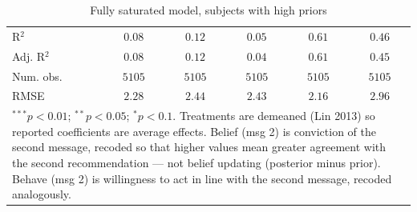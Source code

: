 \begin{table}
\begin{center}
\begin{tabular}{l c c c c c}
\hline
R$^2$                                             & $0.08$       & $0.12$       & $0.05$       & $0.61$        & $0.46$        \\
Adj. R$^2$                                        & $0.08$       & $0.12$       & $0.04$       & $0.61$        & $0.45$        \\
Num. obs.                                         & $5105$       & $5105$       & $5105$       & $5105$        & $5105$        \\
RMSE                                              & $2.28$       & $2.44$       & $2.43$       & $2.16$        & $2.96$        \\
\hline
\multicolumn{6}{l}{\scriptsize{\item $^{***}p<0.01$; $^{**}p<0.05$; $^{*}p<0.1$. Treatments are demeaned (Lin 2013) so reported coefficients are average effects. Belief (msg 2) is conviction of the second message, recoded so that higher values mean greater agreement with the second recommendation --- not belief updating (posterior minus prior). Behave (msg 2) is willingness to act in line with the second message, recoded analogously.}}
\end{tabular}
\caption{Fully saturated model, subjects with high priors}
\label{tab:saturated_high_priors}
\end{center}
\end{table}

